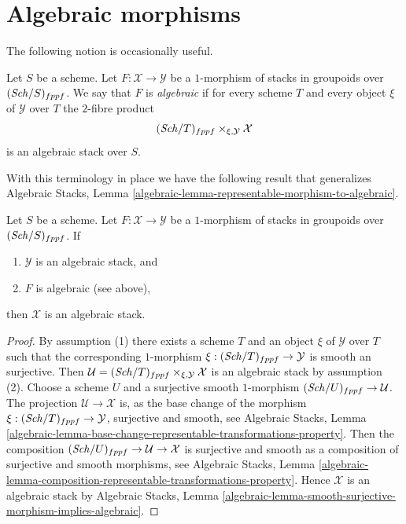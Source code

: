 \section{Algebraic morphisms}
\label{section-algebraic}

\noindent
The following notion is occasionally useful.

\begin{definition}
\label{definition-algebraic}
Let $S$ be a scheme. Let $F : \mathcal{X} \to \mathcal{Y}$ be a
$1$-morphism of stacks in groupoids over $(\mathit{Sch}/S)_{fppf}$.
We say that $F$ is {\it algebraic} if for every scheme $T$ and every
object $\xi$ of $\mathcal{Y}$ over $T$ the $2$-fibre product
$$
(\mathit{Sch}/T)_{fppf} \times_{\xi, \mathcal{Y}} \mathcal{X}
$$
is an algebraic stack over $S$.
\end{definition}

\noindent
With this terminology in place we have the following result that generalizes
Algebraic Stacks, Lemma
\ref{algebraic-lemma-representable-morphism-to-algebraic}.

\begin{lemma}
\label{lemma-algebraic-morphism-to-algebraic}
Let $S$ be a scheme.
Let $F : \mathcal{X} \to \mathcal{Y}$ be a $1$-morphism of
stacks in groupoids over $(\mathit{Sch}/S)_{fppf}$. If
\begin{enumerate}
\item $\mathcal{Y}$ is an algebraic stack, and
\item $F$ is algebraic (see above),
\end{enumerate}
then $\mathcal{X}$ is an algebraic stack.
\end{lemma}

\begin{proof}
By assumption (1) there exists a scheme $T$ and an object
$\xi$ of $\mathcal{Y}$ over $T$ such that the corresponding
$1$-morphism $\xi : (\mathit{Sch}/T)_{fppf} \to \mathcal{Y}$
is smooth an surjective. Then
$\mathcal{U} = (\mathit{Sch}/T)_{fppf} \times_{\xi, \mathcal{Y}} \mathcal{X}$
is an algebraic stack by assumption (2).
Choose a scheme $U$ and a surjective smooth $1$-morphism
$(\mathit{Sch}/U)_{fppf} \to \mathcal{U}$.
The projection $\mathcal{U} \longrightarrow \mathcal{X}$
is, as the base change of the morphism
$\xi : (\mathit{Sch}/T)_{fppf} \to \mathcal{Y}$,
surjective and smooth, see
Algebraic Stacks, Lemma
\ref{algebraic-lemma-base-change-representable-transformations-property}.
Then the composition
$(\mathit{Sch}/U)_{fppf} \to \mathcal{U} \to \mathcal{X}$
is surjective and smooth as a composition of surjective and smooth
morphisms, see
Algebraic Stacks, Lemma
\ref{algebraic-lemma-composition-representable-transformations-property}.
Hence $\mathcal{X}$ is an algebraic stack by
Algebraic Stacks, Lemma
\ref{algebraic-lemma-smooth-surjective-morphism-implies-algebraic}.
\end{proof}

